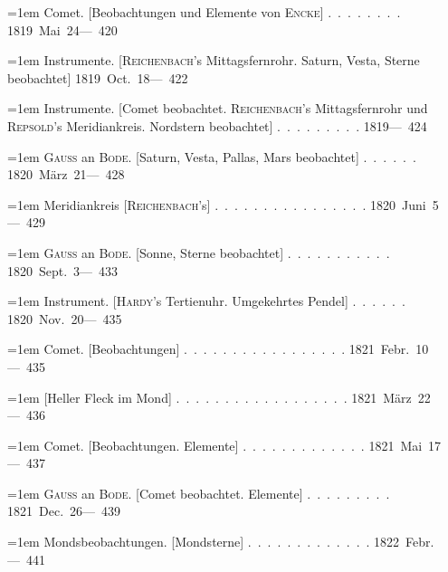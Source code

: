 \noindent\hangindent=1em Comet. [Beobachtungen und Elemente von \textsc{Encke}] \mbox{.\ .\ .\ .\ .\ .\ .\ .} \hfill\mbox{1819 Mai 24}\quad\mbox{--- 420}\par\smallskip
\noindent\hangindent=1em Instrumente. [\textsc{Reichenbach}'s Mittagsfernrohr. Saturn, Vesta, Sterne beobachtet] \hfill\mbox{1819 Oct. 18}\quad\mbox{--- 422}\par\smallskip
\noindent\hangindent=1em Instrumente. [Comet beobachtet. \textsc{Reichenbach}'s Mittagsfernrohr und \textsc{Repsold}'s Meridiankreis. Nordstern beobachtet] \mbox{.\ .\ .\ .\ .\ .\ .\ .\ .} \hfill\mbox{1819}\quad\mbox{--- 424}\par\smallskip
\noindent\hangindent=1em \textsc{Gauss} an \textsc{Bode}. [Saturn, Vesta, Pallas, Mars beobachtet] \mbox{.\ .\ .\ .\ .\ .} \hfill\mbox{1820 März 21}\quad\mbox{--- 428}\par\smallskip
\noindent\hangindent=1em Meridiankreis [\textsc{Reichenbach}'s] \mbox{.\ .\ .\ .\ .\ .\ .\ .\ .\ .\ .\ .\ .\ .\ .\ .} \hfill\mbox{1820 Juni 5}\quad\mbox{--- 429}\par\smallskip
\noindent\hangindent=1em \textsc{Gauss} an \textsc{Bode}. [Sonne, Sterne beobachtet] \mbox{.\ .\ .\ .\ .\ .\ .\ .\ .\ .\ .} \hfill\mbox{1820 Sept. 3}\quad\mbox{--- 433}\par\smallskip
\noindent\hangindent=1em Instrument. [\textsc{Hardy}'s Tertienuhr. Umgekehrtes Pendel] \mbox{.\ .\ .\ .\ .\ .} \hfill\mbox{1820 Nov. 20}\quad\mbox{--- 435}\par\smallskip
\noindent\hangindent=1em Comet. [Beobachtungen] \mbox{.\ .\ .\ .\ .\ .\ .\ .\ .\ .\ .\ .\ .\ .\ .\ .\ .} \hfill\mbox{1821 Febr. 10}\quad\mbox{--- 435}\par\smallskip
\noindent\hangindent=1em [Heller Fleck im Mond] \mbox{.\ .\ .\ .\ .\ .\ .\ .\ .\ .\ .\ .\ .\ .\ .\ .\ .\ .} \hfill\mbox{1821 März 22}\quad\mbox{--- 436}\par\smallskip
\noindent\hangindent=1em Comet. [Beobachtungen. Elemente] \mbox{.\ .\ .\ .\ .\ .\ .\ .\ .\ .\ .\ .\ .} \hfill\mbox{1821 Mai 17}\quad\mbox{--- 437}\par\smallskip
\noindent\hangindent=1em \textsc{Gauss} an \textsc{Bode}. [Comet beobachtet. Elemente] \mbox{.\ .\ .\ .\ .\ .\ .\ .\ .} \hfill\mbox{1821 Dec. 26}\quad\mbox{--- 439}\par\smallskip
\noindent\hangindent=1em Mondsbeobachtungen. [Mondsterne] \mbox{.\ .\ .\ .\ .\ .\ .\ .\ .\ .\ .\ .\ .} \hfill\mbox{1822 Febr.}\quad\mbox{--- 441}\par\smallskip
